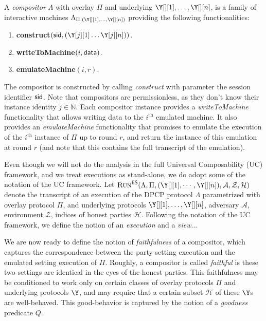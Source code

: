 \begin{definition}[Compositor]
  A \emph{compositor} $\Lambda$ with overlay $\Pi$ and underlying $\Y[][1], \ldots, \Y[][n]$,
  is a family of interactive machines
  $\Lambda_{\Pi,(\Y[][1], \ldots, \Y[][n])}$ providing the following
  functionalities:

  \begin{enumerate}
    \item \textbf{construct}$(\sid, (\Y[j][1] \ldots \Y[j][n]))$.
    \item \textbf{writeToMachine}$(i, \textsf{data})$.
    \item \textbf{emulateMachine}$(i, r)$. %
  \end{enumerate}
\end{definition}

The compositor is constructed by calling \emph{construct} with parameter the session identifier $\textsf{sid}$.
Note that compositors are permissionless, as they don't know their instance identity $j \in \mathbb{N}$.
Each compositor instance provides a \emph{writeToMachine}
functionality that allows writing data to the $i^\text{th}$ emulated machine.
It also provides an \emph{emulateMachine} functionality that promises to emulate the execution of
the $i^\text{th}$ instance of $\Pi$ up to round $r$, and return the instance of this emulation
at round $r$ (and note that this contains the full transcript of the emulation).

Even though we will not do the analysis in the full Universal Composability (UC) framework, and
we treat executions as stand-alone, we do adopt some of the notation of the UC framework.
Let $\LCExec(\Lambda, \Pi, ({\Y[][1]}, \cdots, {\Y[][n]}), \mathcal{A}, \mathcal{Z}, \mathcal{H})$
denote the transcript of an execution of the DPCP protocol $\Lambda$ parametrized with overlay protocol $\Pi$,
and underlying protocols $\Y[][1], \ldots, \Y[][n]$, adversary $\mathcal{A}$, environment $\mathcal{Z}$,
indices of honest parties $\mathcal{H}$.
Following the notation of the UC framework, we define the notion of an \emph{execution}
and a \emph{view}... %

We are now ready to define the notion of \emph{faithfulness} of a
compositor, which captures the
correspondence between the party setting execution and the emulated setting
execution of $\Pi$. Roughly, a compositor is called \emph{faithful} is these
two settings are identical in the eyes of the honest parties.
This faithfulness may be conditioned to work only on certain classes
of overlay protocols $\Pi$ and underlying protocols $\Y$, and may
require that a certain subset $\mathcal{H}$ of these $\Y$s are well-behaved.
This good-behavior is captured by the notion of a \emph{goodness} predicate $Q$.


